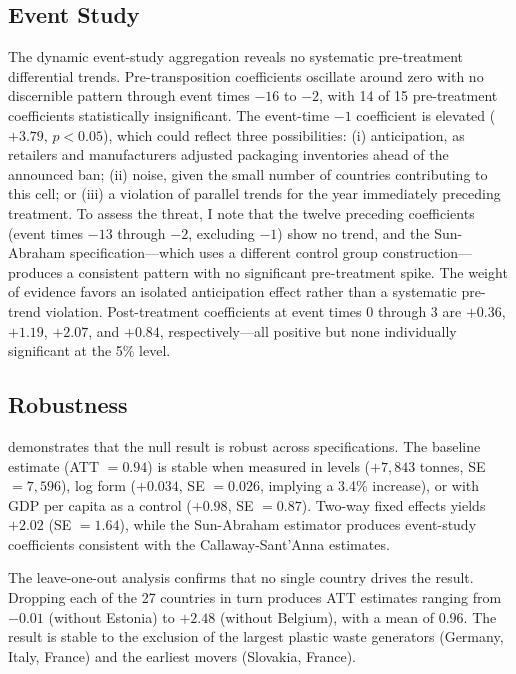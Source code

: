 \documentclass[12pt]{article}
\begin{document}


\subsection{Event Study}

The dynamic event-study aggregation reveals no systematic pre-treatment differential trends. Pre-transposition coefficients oscillate around zero with no discernible pattern through event times $-16$ to $-2$, with 14 of 15 pre-treatment coefficients statistically insignificant. The event-time $-1$ coefficient is elevated ($+3.79$, $p < 0.05$), which could reflect three possibilities: (i) anticipation, as retailers and manufacturers adjusted packaging inventories ahead of the announced ban; (ii) noise, given the small number of countries contributing to this cell; or (iii) a violation of parallel trends for the year immediately preceding treatment. To assess the threat, I note that the twelve preceding coefficients (event times $-13$ through $-2$, excluding $-1$) show no trend, and the Sun-Abraham specification---which uses a different control group construction---produces a consistent pattern with no significant pre-treatment spike. The weight of evidence favors an isolated anticipation effect rather than a systematic pre-trend violation. Post-treatment coefficients at event times 0 through 3 are $+0.36$, $+1.19$, $+2.07$, and $+0.84$, respectively---all positive but none individually significant at the 5\% level.

\subsection{Robustness}

 demonstrates that the null result is robust across specifications. The baseline estimate (ATT $= 0.94$) is stable when measured in levels ($+7{,}843$ tonnes, SE $= 7{,}596$), log form ($+0.034$, SE $= 0.026$, implying a 3.4\% increase), or with GDP per capita as a control ($+0.98$, SE $= 0.87$). Two-way fixed effects yields $+2.02$ (SE $= 1.64$), while the Sun-Abraham estimator produces event-study coefficients consistent with the Callaway-Sant'Anna estimates.

The leave-one-out analysis confirms that no single country drives the result. Dropping each of the 27 countries in turn produces ATT estimates ranging from $-0.01$ (without Estonia) to $+2.48$ (without Belgium), with a mean of $0.96$. The result is stable to the exclusion of the largest plastic waste generators (Germany, Italy, France) and the earliest movers (Slovakia, France).
\end{document}
